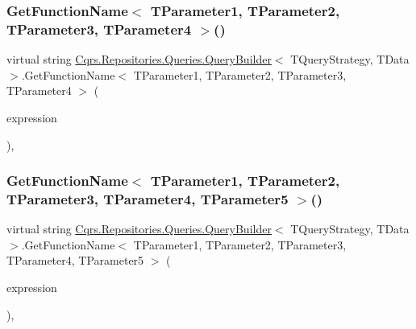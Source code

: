 \subsubsection{\texorpdfstring{Get\+Function\+Name$<$ T\+Parameter1, T\+Parameter2, T\+Parameter3, T\+Parameter4 $>$()}{GetFunctionName< TParameter1, TParameter2, TParameter3, TParameter4 >()}}
{\footnotesize\ttfamily virtual string \hyperlink{classCqrs_1_1Repositories_1_1Queries_1_1QueryBuilder}{Cqrs.\+Repositories.\+Queries.\+Query\+Builder}$<$ T\+Query\+Strategy, T\+Data $>$.Get\+Function\+Name$<$ T\+Parameter1, T\+Parameter2, T\+Parameter3, T\+Parameter4 $>$ (\begin{DoxyParamCaption}\item[{Func$<$ T\+Parameter1, T\+Parameter2, T\+Parameter3, T\+Parameter4, T\+Query\+Strategy $>$}]{expression }\end{DoxyParamCaption})\hspace{0.3cm}{\ttfamily [protected]}, {\ttfamily [virtual]}}

\mbox{\label{classCqrs_1_1Repositories_1_1Queries_1_1QueryBuilder_a0228422245afb7fe388114236bb1aefa_a0228422245afb7fe388114236bb1aefa}} 
\subsubsection{\texorpdfstring{Get\+Function\+Name$<$ T\+Parameter1, T\+Parameter2, T\+Parameter3, T\+Parameter4, T\+Parameter5 $>$()}{GetFunctionName< TParameter1, TParameter2, TParameter3, TParameter4, TParameter5 >()}}
{\footnotesize\ttfamily virtual string \hyperlink{classCqrs_1_1Repositories_1_1Queries_1_1QueryBuilder}{Cqrs.\+Repositories.\+Queries.\+Query\+Builder}$<$ T\+Query\+Strategy, T\+Data $>$.Get\+Function\+Name$<$ T\+Parameter1, T\+Parameter2, T\+Parameter3, T\+Parameter4, T\+Parameter5 $>$ (\begin{DoxyParamCaption}\item[{Func$<$ T\+Parameter1, T\+Parameter2, T\+Parameter3, T\+Parameter4, T\+Parameter5, T\+Query\+Strategy $>$}]{expression }\end{DoxyParamCaption})\hspace{0.3cm}{\ttfamily [protected]}, {\ttfamily [virtual]}}

